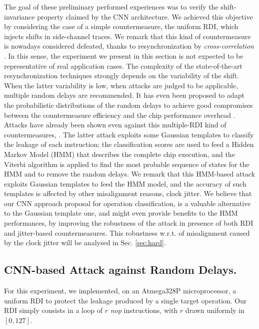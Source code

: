 The goal of these preliminary performed experiences was to verify the shift-invariance property claimed by the CNN architecture. We achieved this objective by considering the case of a simple countermeasure, the uniform RDI, which injects shifts in side-channel traces. We remark that this kind of countermeasure is nowadays considered defeated, \eg thanks to resynchronization by \emph{cross-correlation} \cite{nagashima2007dpa}. In this sense, the experiment we present in this section is not expected to be representative of real application cases. The complexity of the state-of-the-art resynchronization techniques strongly depends on the variability of the shift. When the latter variability is low, \ie when attacks are judged to be applicable, multiple random delays are recommended. It has even been proposed to adapt the probabilistic distributions of the random delays to achieve good compromises between the countermeasure efficiency and the chip performance overhead \cite{coron2009efficient,coron2010analysis}. Attacks have already been shown even against this multiple-RDI kind of countermeasures, \eg \cite{durvaux2012efficient}. The latter attack exploits some Gaussian templates to classify the leakage of each instruction; the classification scores are used to feed a Hidden Markov Model (HMM) that describes the complete chip execution, and the Viterbi algorithm is applied to find the most probable sequence of states for the HMM and to remove the random delays. We remark that this HMM-based attack exploits Gaussian templates to feed the HMM model, and the accuracy of such templates is affected by other misalignment reasons, \eg clock jitter. We believe that our  CNN approach proposal for operation classification, is a valuable alternative to  the Gaussian template one, and might even provide benefits to the HMM performances, by \eg improving the robustness of the attack in presence of both RDI and jitter-based countermeasures. This robustness w.r.t. of misalignment caused by the clock jitter will be analysed in Sec. \ref{sec:hard}.

\subsection{CNN-based Attack against Random Delays.}\label{sec:soft}
For this experiment, we implemented, on an Atmega328P microprocessor, a uniform RDI \cite{tunstall2007efficient} to protect the leakage produced by a single target operation. Our RDI simply consists in a loop of  $r$ \emph{nop} instructions, with $r$  drawn uniformly in $[0,127]$.

